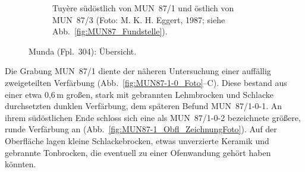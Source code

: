 \begin{figure}[!tb]
\begin{subfigure}[t]{\columnwidth}
 \caption{Tuyère südöstlich von MUN~87/1 und östlich von MUN~87/3 (Foto: M. K. H. Eggert, 1987; siehe Abb.~\ref{fig:MUN87_Fundstelle}).}
 \label{fig:MUN87-101_Tuyere}
 \end{subfigure}
 \caption{Munda (Fpl.~304): Übersicht.}
 \label{fig:MUN87_Fundstelle_Fotos}
\end{figure}

Die Grabung MUN~87/1 diente der näheren Untersuchung einer auffällig zweigeteilten Verfärbung (Abb.~\ref{fig:MUN87-1-0_Foto}--C). Diese bestand aus einer etwa 0,6\,m großen, stark mit gebrannten Lehmbrocken und Schlacke durchsetzten dunklen Verfärbung, dem späteren Befund MUN~87/1-0-1. An ihrem südöstlichen Ende schloss sich eine als MUN~87/1-0-2 bezeichnete größere, runde Verfärbung an (Abb.~\ref{fig:MUN87-1_Obfl_ZeichnungFoto}). Auf der Oberfläche lagen kleine Schlackebrocken, etwas unverzierte Keramik und gebrannte Tonbrocken, die eventuell zu einer Ofenwandung gehört haben könnten.

